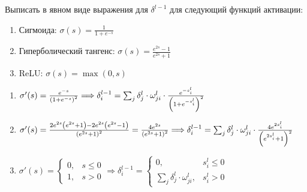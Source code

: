 \begin{task}[2]
Выписать в явном виде выражения для $\delta^{l-1}$ для следующий функций активации:
\begin{enumerate}
	\item Сигмоида: $\sigma(s) = \frac{1}{1 + e^{-s}}$
	\item Гиперболический тангенс: $\sigma(s) = \frac{e^{2s} - 1}{e^{2s} + 1}$
	\item ReLU: $\sigma(s) = \max{(0, s)}$
\end{enumerate}
\end{task}
\begin{solution}
\begin{enumerate}
	\item $\sigma'(s) = \frac{e^{-s}}{\left( 1 + e^{-s} \right)^2} \Longrightarrow 
	       \delta^{l-1}_i = \sum_j{\delta_j^l \cdot \omega_{ji}^l \cdot \frac{e^{-s_i^l}}{\left( 1 + e^{-s_i^l} \right)^2}}$
	\item $\sigma'(s) = \frac{2e^{2s}\left( e^{2s}+1 \right)-2e^{2s}\left( e^{2s}-1 \right)}{\left( e^{2s}+1 \right)^2}
	                  = \frac{4e^{2s}}{\left( e^{2s}+1 \right)^2} \Longrightarrow 
	       \delta^{l-1}_i = \sum_j{\delta_j^l \cdot \omega_{ji}^l \cdot \frac{4e^{2s_i^l}}{\left( e^{2s_i^l}+1 \right)^2}}$
	\item $\sigma'(s) = \begin{cases} 0, & s \leq 0 \\ 1, & s > 0\end{cases} \Longrightarrow
	       \delta^{l-1}_i = \begin{cases} 0, & s_i^l \leq 0 \\ \sum_j{\delta_j^l \cdot \omega_{ji}^l}, & s_i^l > 0 \end{cases}$
\end{enumerate}
\end{solution}

